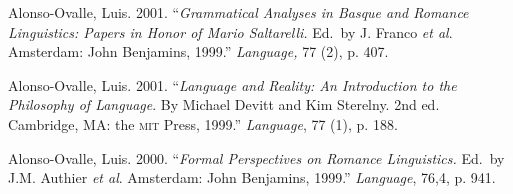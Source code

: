 \documentclass[11pt]{article}
\begin{document}
Alonso-Ovalle, Luis. 2001. ``{\it Grammatical Analyses in Basque and Romance Linguistics: Papers in Honor of Mario Saltarelli.} Ed.\ by J. Franco \textit{et al}. Amsterdam: John Benjamins, 1999.'' {\it Language,} 77 (2), p. 407.

Alonso-Ovalle, Luis. 2001. ``{\it Language and Reality: An Introduction to the Philosophy of Language}. By  Michael Devitt and Kim Sterelny. 2nd ed. Cambridge, MA: the \textsc{mit} Press, 1999.'' {\it Language}, 77 (1), p. 188.

Alonso-Ovalle, Luis. 2000. ``{\it Formal Perspectives on Romance Linguistics.} Ed.\ by J.M. Authier \textit{et al}. Amsterdam: John Benjamins, 1999.'' {\it Language}, 76,4, p. 941.
 






\end{document}
